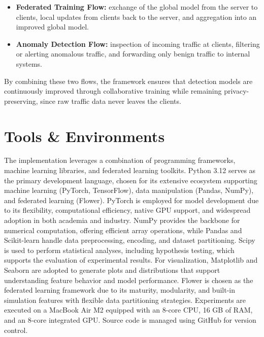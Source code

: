 \begin{itemize}
    \item \textbf{Federated Training Flow:} exchange of the global model from the server to clients, local updates from clients back to the server, and aggregation into an improved global model.
    \item \textbf{Anomaly Detection Flow:} inspection of incoming traffic at clients, filtering or alerting anomalous traffic, and forwarding only benign traffic to internal systems.
\end{itemize}

By combining these two flows, the framework ensures that detection models are continuously improved through collaborative training while remaining privacy-preserving, since raw traffic data never leaves the clients.

\section{Tools \& Environments}

The implementation leverages a combination of programming frameworks, machine learning libraries, and federated learning toolkits. Python 3.12 \citep{python} serves as the primary development language, chosen for its extensive ecosystem supporting machine learning (PyTorch, TensorFlow), data manipulation (Pandas, NumPy), and federated learning (Flower). PyTorch \citep{pytorch} is employed for model development due to its flexibility, computational efficiency, native GPU support, and widespread adoption in both academia and industry. NumPy \citep{numpy} provides the backbone for numerical computation, offering efficient array operations, while Pandas \citep{pandas} and Scikit-learn \citep{sklearn} handle data preprocessing, encoding, and dataset partitioning. Scipy \citep{scipy} is used to perform statistical analyses, including hypothesis testing, which supports the evaluation of experimental results. For visualization, Matplotlib \citep{matplotlib} and Seaborn \citep{seaborn} are adopted to generate plots and distributions that support understanding feature behavior and model performance. Flower \citep{flower} is chosen as the federated learning framework due to its maturity, modularity, and built-in simulation features with flexible data partitioning strategies. Experiments are executed on a MacBook Air M2 equipped with an 8-core CPU, 16 GB of RAM, and an 8-core integrated GPU. Source code is managed using GitHub for version control.

